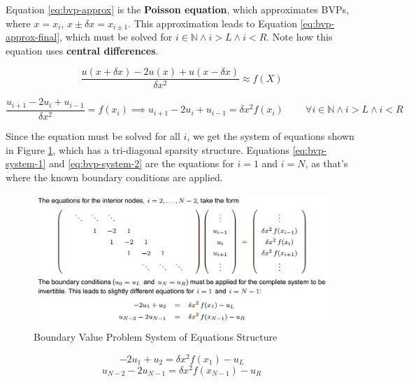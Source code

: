 \documentclass{article}
\begin{document}
Equation \ref{eq:bvp-approx} is the \textbf{Poisson equation}, which approximates BVPs, where $x = x_i$, $x \pm \delta x = x_{i \pm 1}$. This approximation leads to Equation \ref{eq:bvp-approx-final}, which must be solved for $i \in \mathbb{N} \land i > L \land i < R$. Note how this equation uses \textbf{central differences}.

\begin{equation}
	\frac{u(x + \delta x) - 2u(x) + u(x - \delta x)}{\delta x^2} \approx f(X)
	\label{eq:bvp-approx}
\end{equation}

\begin{equation}
	\frac{u_{i+1} - 2u_i + u_{i - 1}}{\delta x^2} = f(x_i)
	\implies
	u_{i+1} - 2u_i + u_{i - 1} = \delta x^2 f(x_i) 
	\;\;\;\;\;\;\;\; \forall 
	i \in \mathbb{N} \land i > L \land i < R
	\label{eq:bvp-approx-final}
\end{equation}

Since the equation must be solved for all $i$, we get the system of equations shown in Figure \ref{fig:bvp-system}, which has a tri-diagonal sparsity structure. Equations \ref{eq:bvp-system-1} and \ref{eq:bvp-system-2} are the equations for $i = 1$ and $i = N$, as that's where the known boundary conditions are applied.

\begin{figure}
	\centering
	\includegraphics[scale=0.45]{figures/bvp-system.png}
	\caption{Boundary Value Problem System of Equations Structure}
	\label{fig:bvp-system}
\end{figure}
\begin{equation}
	-2u_1 + u_2 = \delta x^2 f(x_1) - u_L
	\label{eq:bvp-system-1}
\end{equation}
\begin{equation}
	u_{N - 2} - 2u_{N - 1} = \delta x^2 f(x_{N - 1}) - u_R
	\label{eq:bvp-system-2}
\end{equation}
\end{document}
